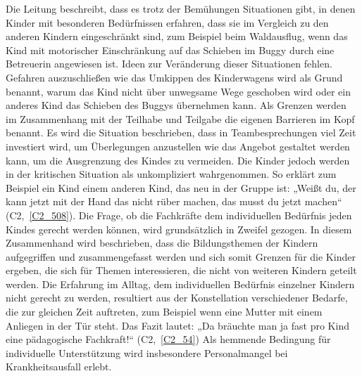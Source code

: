 Die Leitung beschreibt, dass es trotz der Bemühungen Situationen gibt, in denen Kinder mit besonderen Bedürfnissen erfahren, dass sie im Vergleich zu den anderen Kindern eingeschränkt sind, zum Beispiel beim Waldausflug, wenn das Kind mit motorischer Einschränkung auf das Schieben im Buggy durch eine Betreuerin angewiesen ist. Ideen zur Veränderung dieser Situationen fehlen. Gefahren auszuschließen wie das Umkippen des Kinderwagens wird als Grund benannt, warum das Kind nicht über unwegsame Wege geschoben wird oder ein anderes Kind das Schieben des Buggys übernehmen kann. Als Grenzen werden im Zusammenhang mit der Teilhabe und Teilgabe die eigenen Barrieren im Kopf benannt. Es wird die Situation beschrieben, dass in Teambesprechungen viel Zeit investiert wird, um Überlegungen anzustellen wie das Angebot gestaltet werden kann, um die Ausgrenzung des Kindes zu vermeiden. Die Kinder jedoch werden in der kritischen Situation als unkompliziert wahrgenommen. So erklärt zum Beispiel ein Kind einem anderen Kind, das neu in der Gruppe ist: „Weißt du, der kann jetzt mit der Hand das nicht rüber machen, das musst du jetzt machen“ (C2,~\ref{C2_508}).
Die Frage, ob die Fachkräfte dem individuellen Bedürfnis jeden Kindes gerecht werden können, wird grundsätzlich in Zweifel gezogen. In diesem Zusammenhand wird beschrieben, dass die Bildungsthemen der Kindern aufgegriffen und zusammengefasst werden und sich somit Grenzen für die Kinder ergeben, die sich für Themen interessieren, die nicht von weiteren Kindern geteilt werden. Die Erfahrung im Alltag, dem individuellen Bedürfnis einzelner Kindern nicht gerecht zu werden, resultiert aus der Konstellation verschiedener Bedarfe, die zur gleichen Zeit auftreten, zum Beispiel wenn eine Mutter mit einem Anliegen in der Tür steht. Das Fazit lautet: „Da bräuchte man ja fast pro Kind eine pädagogische Fachkraft!“ (C2,~\ref{C2_54}) 
Als hemmende Bedingung für individuelle Unterstützung wird insbesondere Personalmangel bei Krankheitsausfall erlebt.

